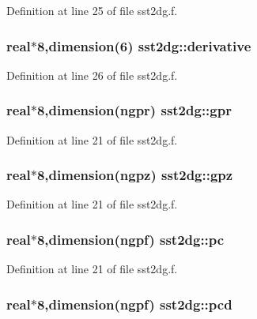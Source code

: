 Definition at line 25 of file sst2dg.f.\hypertarget{namespacesst2dg_3ba2dea221af554e256dce59b5dbb988}{
\subsubsection[derivative]{\setlength{\rightskip}{0pt plus 5cm}real$\ast$8,dimension(6) {\bf sst2dg::derivative}}}
\label{namespacesst2dg_3ba2dea221af554e256dce59b5dbb988}




Definition at line 26 of file sst2dg.f.\hypertarget{namespacesst2dg_f791e86241018c9bb33cec0443b40af8}{
\subsubsection[gpr]{\setlength{\rightskip}{0pt plus 5cm}real$\ast$8,dimension(ngpr) {\bf sst2dg::gpr}}}
\label{namespacesst2dg_f791e86241018c9bb33cec0443b40af8}




Definition at line 21 of file sst2dg.f.\hypertarget{namespacesst2dg_82caba92133c4a04b34288af472f7062}{
\subsubsection[gpz]{\setlength{\rightskip}{0pt plus 5cm}real$\ast$8,dimension(ngpz) {\bf sst2dg::gpz}}}
\label{namespacesst2dg_82caba92133c4a04b34288af472f7062}




Definition at line 21 of file sst2dg.f.\hypertarget{namespacesst2dg_9f23908c8ac0e5d6fbb4ad52dc264f34}{
\subsubsection[pc]{\setlength{\rightskip}{0pt plus 5cm}real$\ast$8,dimension(ngpf) {\bf sst2dg::pc}}}
\label{namespacesst2dg_9f23908c8ac0e5d6fbb4ad52dc264f34}




Definition at line 21 of file sst2dg.f.\hypertarget{namespacesst2dg_3faab1369647d235c6af4263bbb20b5f}{
\subsubsection[pcd]{\setlength{\rightskip}{0pt plus 5cm}real$\ast$8,dimension(ngpf) {\bf sst2dg::pcd}}}
\label{namespacesst2dg_3faab1369647d235c6af4263bbb20b5f}




